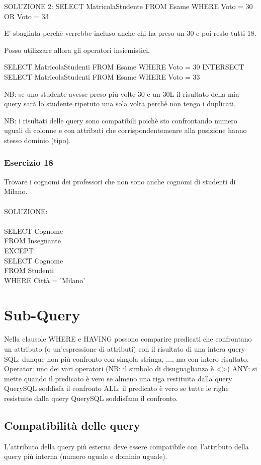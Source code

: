 \documentclass[12pt,a4paper]{book}
\begin{document}
SOLUZIONE 2:
SELECT MatricolaStudente
FROM Esame
WHERE Voto = 30 OR Voto = 33

E' sbagliata perchè verrebbe incluso anche chi ha preso un 30 e poi resto tutti 18.

Posso utilizzare allora gli operatori insiemistici.

SELECT MatricolaStudenti
FROM Esame
WHERE Voto = 30
INTERSECT
SELECT MatricolaStudenti
FROM Esame
WHERE Voto = 33

NB: se uno studente avesse preso più volte 30 e un 30L il risultato della mia query sarà lo studente ripetuto una sola volta perchè non tengo i duplicati.

NB: i risultati delle query sono compatibili poichè sto confrontando numero uguali di colonne e con attributi che corrispondentemenre alla posizione hanno stesso dominio (tipo).

\subsubsection{Esercizio 18}
Trovare i cognomi dei professori che non sono anche cognomi di studenti di Milano.\\
\\
SOLUZIONE:\\
\\
SELECT Cognome\\
FROM Insegnante\\
EXCEPT\\
SELECT Cognome\\
FROM Studenti\\
WHERE Città = 'Milano'\\

\section{Sub-Query}
Nella clausole WHERE e HAVING possono comparire predicati che confrontano un attributo (o un'espressione di attributi) con il risultato di una intera query SQL: dunque non più confronto con singola stringa, ..., ma con intero risultato.\\

Operator: uno dei vari operatori (NB: il simbolo di disuguaglianza è <>)
ANY: si mette quando il predicato è vero se almeno una riga restituita dalla query QuerySQL soddisfa il confronto 
ALL: il predicato è vero se tutte le righe resistuite dalla query QuerySQL soddisfano il confronto.

\subsection{Compatibilità delle query}
L'attributo della query più esterna deve essere compatibile con l'attributo della query più interna (numero uguale e dominio uguale).
\end{document}
